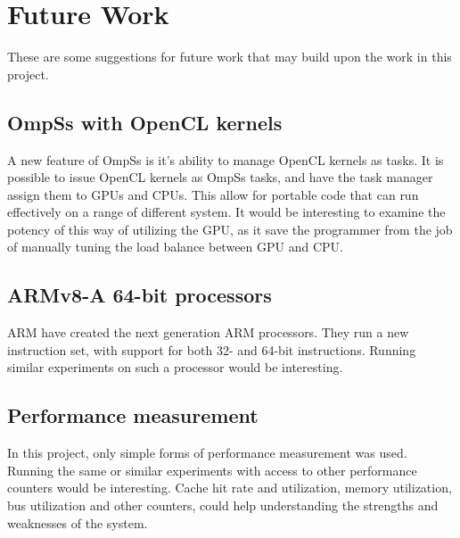 \chapter[Future Work]{Future Work}
These are some suggestions for future work that may build upon the work in this project.

\section{OmpSs with OpenCL kernels}
A new feature of OmpSs is it's ability to manage OpenCL kernels as tasks.
It is possible to issue OpenCL kernels as OmpSs tasks, and have the task manager assign them to GPUs and CPUs.
This allow for portable code that can run effectively on a range of different system.
It would be interesting to examine the potency of this way of utilizing the GPU, as it save the programmer from the job of manually tuning the load balance between GPU and CPU.

\section{ARMv8-A 64-bit processors}
ARM have created the next generation ARM processors.
They run a new instruction set, with support for both 32- and 64-bit instructions.
Running similar experiments on such a processor would be interesting.

\section{Performance measurement}
In this project, only simple forms of performance measurement was used.
Running the same or similar experiments with access to other performance counters would be interesting.
Cache hit rate and utilization, memory utilization, bus utilization and other counters, could help understanding the strengths and weaknesses of the system.

